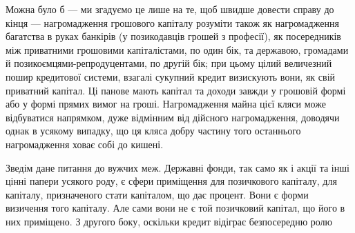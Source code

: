 Можна було б — ми згадуємо це лише на те, щоб швидше довести справу
до кінця — нагромадження грошового капіталу розуміти також як нагромадження
багатства в руках банкірів (у позикодавців грошей з професії), як посередників
між приватними грошовими капіталістами, по один бік, та державою, громадами
й позикоємцями-репродуцентами, по другій бік; при цьому цілий величезний
пошир кредитової системи, взагалі сукупний кредит визискують вони, як свій приватний
капітал. Ці панове мають капітал та доходи завжди у грошовій формі
або у формі прямих вимог на гроші. Нагромадження майна цієї кляси може
відбуватися напрямком, дуже відмінним від дійсного нагромадження, доводячи
однак в усякому випадку, що ця кляса добру частину того останнього нагромадження
ховає собі до кишені.

Зведім дане питання до вужчих меж. Державні фонди, так само як і акції та
інші цінні папери усякого роду, є сфери приміщення для позичкового капіталу,
для капіталу, призначеного стати капіталом, що дає процент. Вони є форми визичення
того капіталу. Але сами вони не є той позичковий капітал, що його
в них приміщено. З другого боку, оскільки кредит відіграє безпосередню ролю
\parbreak{}  %
